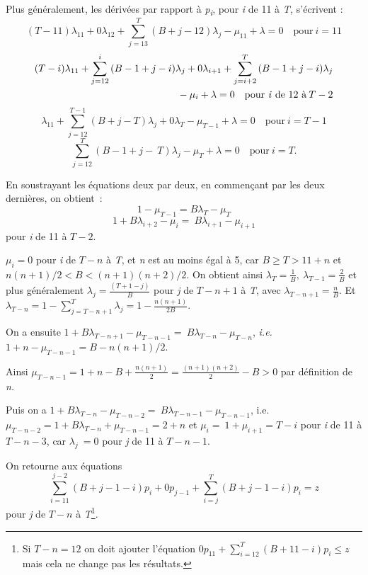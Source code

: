 \begin{Article}
\begin{refsection}[UmbhauerFR]
\begin{appendices}
Plus généralement, les dérivées par rapport à \emph{p\textsubscript{i}},
pour \emph{i} de 11 à \emph{T,} s'écrivent :
\[
(T - 11)\lambda_{11} + 0\lambda_{12} + \sum_{j = 13}^{T}{(B + j - 12)\lambda_{j}} - \mu_{11} + \lambda = 0
\quad \text{pour} \: i = 11
\]
\begin{equation*}
\begin{split}
(T - i)\lambda_{11} + \sum_{j = 12}^{i}{(B - 1 + j - i)\lambda_{j} + 0\lambda_{i + 1} + \sum_{j = i + 2}^{T}{(B - 1 + j - i)\lambda_{j}}}\\
{-\: \mu_{i} + \lambda = 0} \quad \text{pour \emph{i} de 12 à} \: T - 2  
\end{split}
\end{equation*}
\[
\lambda_{11} + \sum_{j = 12}^{T - 1}{(B + j - T)\lambda_{j} + 0\lambda_{T} - \mu_{T - 1} + \lambda = 0} \quad \text{pour} \: i = T - 1
\]
\[
\sum_{j = 12}^{T}{(B - 1 + j - \ T)\lambda_{j} - \mu_{T} + \lambda = 0}
\quad \text{pour} \: i = T.
\]

En soustrayant les équations deux par deux, en commençant par les deux
dernières, on obtient~:
\[1 - \mu_{T - 1} = B\lambda_{T} - \mu_{T}\]
\[1 + B\lambda_{i + 2} - \mu_{i} = \ B\lambda_{i + 1} - \mu_{i + 1}\]
pour \emph{i} de 11 à \(T - 2\).

$\mu_i = 0$ pour \emph{i} de \(T - n\) à \emph{T}, et
\emph{n} est au moins égal à 5, car \(B \geq T > 11 + n\) et
\(n(n + 1)/2 < B < (n + 1)(n + 2)/2\). On obtient ainsi
\(\lambda_{T} = \frac{1}{B},\ \lambda_{T - 1} = \frac{2}{B}\) et plus
généralement \(\lambda_{j} = \frac{(T + 1 - j)}{B}\) pour \emph{j} de
\(T - n + 1\) à \emph{T}, avec \(\lambda_{T - n + 1} = \frac{n}{B}\). Et
\(\lambda_{T - n} = 1 - \sum_{j = T - n + 1}^{T}\lambda_{j} = 1 - \frac{n(n + 1)}{2B}.\)

On a ensuite \(1 + B\lambda_{T - n + 1} - \mu_{T - n - 1} = \ B\lambda_{T - n} - \mu_{T - n}\), \emph{i.e.} \(1 + n - \mu_{T - n - 1} = B - n(n + 1)/2\).

Ainsi \(\mu_{T - n - 1} = 1 + n - B + \frac{n(n + 1)}{2} = \frac{(n + 1)(n + 2)}{2} - B > 0\) par définition de \emph{n.}

Puis on a \(1 + B\lambda_{T - n} - \mu_{T - n - 2} = \ B\lambda_{T - n - 1} - \mu_{T - n - 1}\), i.e. \(\mu_{T - n - 2} = 1 + B\lambda_{T - n} + \mu_{T - n - 1} = 2 + n\) et
\(\mu_{i} = \ 1 + \mu_{i + 1} = T - i\) pour \emph{i} de 11 à \(T - n - 3\),
car \(\lambda_{j}\  = 0\) pour \emph{j} de 11 à \(T - n - 1\).

On retourne aux équations
\[\sum_{i = 11}^{j - 2}{(B + j - 1 - i)p_{i} + 0p_{j - 1} + \sum_{i = j}^{T}{(B + j - 1 - i)p_{i} = z}}\]
pour \emph{j} de $T-n$ à \emph{T}\footnote{Si $T-n=12$ on doit
  ajouter l'équation \(0p_{11} + \sum_{i = 12}^{T}{(B + 11 - i)p_{i} \leq z}\) mais cela ne change pas les résultats.}.


\end{appendices}
\end{refsection}
\end{Article}
